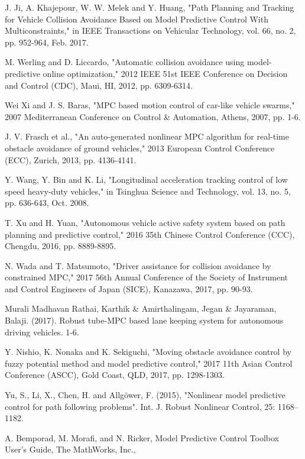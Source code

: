 \documentclass[conference, 11pt]{IEEEtran}
\begin{document}
\begin{thebibliography}{00}
	J. Ji, A. Khajepour, W. W. Melek and Y. Huang, "Path Planning and Tracking for Vehicle Collision Avoidance Based on Model Predictive Control With Multiconstraints," in IEEE Transactions on Vehicular Technology, vol. 66, no. 2, pp. 952-964, Feb. 2017.
	
	M. Werling and D. Liccardo, "Automatic collision avoidance using model-predictive online optimization," 2012 IEEE 51st IEEE Conference on Decision and Control (CDC), Maui, HI, 2012, pp. 6309-6314.
	
	Wei Xi and J. S. Baras, "MPC based motion control of car-like vehicle swarms," 2007 Mediterranean Conference on Control \& Automation, Athens, 2007, pp. 1-6.
	
	J. V. Frasch et al., "An auto-generated nonlinear MPC algorithm for real-time obstacle avoidance of ground vehicles," 2013 European Control Conference (ECC), Zurich, 2013, pp. 4136-4141.
	
	Y. Wang, Y. Bin and K. Li, "Longitudinal acceleration tracking control of low speed heavy-duty vehicles," in Tsinghua Science and Technology, vol. 13, no. 5, pp. 636-643, Oct. 2008.
	
	T. Xu and H. Yuan, "Autonomous vehicle active safety system based on path planning and predictive control," 2016 35th Chinese Control Conference (CCC), Chengdu, 2016, pp. 8889-8895.
	
	N. Wada and T. Matsumoto, "Driver assistance for collision avoidance by constrained MPC," 2017 56th Annual Conference of the Society of Instrument and Control Engineers of Japan (SICE), Kanazawa, 2017, pp. 90-93.
	
	Murali Madhavan Rathai, Karthik \& Amirthalingam, Jegan \& Jayaraman, Balaji. (2017). Robust tube-MPC based lane keeping system for autonomous driving vehicles. 1-6.
	
	Y. Nishio, K. Nonaka and K. Sekiguchi, "Moving obstacle avoidance control by fuzzy potential method and model predictive control," 2017 11th Asian Control Conference (ASCC), Gold Coast, QLD, 2017, pp. 1298-1303.
	
	Yu, S., Li, X., Chen, H. and Allgöwer, F. (2015), "Nonlinear model predictive control for path following problems". Int. J. Robust Nonlinear Control, 25: 1168–1182. 
	
	A. Bemporad, M. Morafi, and N. Ricker, Model Predictive Control Toolbox User’s Guide, The MathWorks, Inc.,
	

\end{thebibliography}
\end{document}
